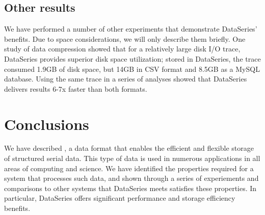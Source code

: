 \documentclass{acm_proc_article-sp}
\begin{document}
\subsection{Other results}\label{sec:otherresults}

We have performed a number of other experiments that demonstrate
DataSeries' benefits. Due to space considerations, we will only
describe them briefly. One study of data compression showed that for a
relatively large disk I/O trace, DataSeries provides superior disk
space utilization; stored in DataSeries, the trace consumed 1.9GB of
disk space, but 14GB in CSV format and 8.5GB as a MySQL
database. Using the same trace in a series of analyses showed that
DataSeries delivers results 6-7x faster than both formats.

\section{Conclusions}\label{sec:conclusions}

We have described \DataSeries{}, a data format that enables the
efficient and flexible storage of structured serial data. This type of
data is used in numerous applications in all areas of computing and
science. We have identified the properties required for a system that
processes such data, and shown through a series of experiements and
comparisons to other systems that DataSeries meets satisfies these
properties. In particular, DataSeries offers significant performance
and storage efficiency benefits.


{\small

}
%
%
\balancecolumns
\end{document}
